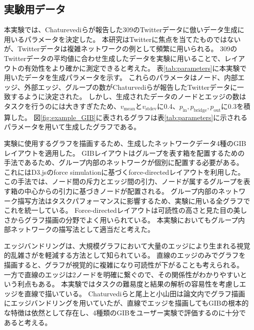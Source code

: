 \documentclass{kuee}
\begin{document}
\subsection{実験用データ}
\label{subsec:data_for_ex1}

本実験では、Chaturevediらが報告した309のTwitterデータ\cite{chaturvedi2014group}に倣いデータ生成に用いるパラメータを決定した。
本研究はTwitterに焦点を当てたものではないが、Twitterデータは複雑ネットワークの例として頻繁に用いられる。
309のTwitterデータの平均値に合わせ生成したデータを実験に用いることで、レイアウトの有効性をより確かに測定できると考えた。
表\ref{tab:parameters}に本実験で用いたデータを生成パラメータを示す。
これらのパラメータはノード、内部エッジ、外部エッジ、グループの数がChaturvediらが報告したTwitterデータに一致するように決定された。
しかし、生成されたデータのノードとエッジの数はタスクを行うのには大きすぎたため、$v_{\text{mean}}$と$v_{\text{stdev}}$に0.4、$p_{\text{in}}, p_{\text{bridge}}, p_{\text{out}}$に0.3を積算した。
図\ref{fig:example_GIB}に表されるグラフは表\ref{tab:parameters}に示されるパラメータを用いて生成したグラフである。

実験に使用するグラフを描画するため、生成したネットワークデータ4種のGIBレイアウトを適用した。
GIBレイアウトはグループを表す箱を配置するための手法であるため、グループ内部のネットワークが個別に配置する必要がある。
これにはD3.jsのforce simulation\cite{Bostock:2011:DDD:2068462.2068631}に基づくforce-directedレイアウトを利用した。
この手法では、ノード間の斥力とエッジ間の引力、ノードが属するグループを表す箱の中心からの引力に基づきノードが配置される。
グループ内部のネットワーク描写方法はタスクパフォーマンスに影響するため、実験に用いる全グラフでこれを統一している。
Force-directedレイアウトは可読性の高さと見た目の美しさからグラフ描画の分野でよく用いられている\cite{Kobourov2013ForceDirectedDA}。
本実験においてもグループ内部ネットワークの描写法として適当だと考えた。

エッジバンドリングは、大規模グラフにおいて大量のエッジにより生まれる視覚的乱雑さがを軽減する方法として知られている\cite{lhuillier2017state}。
直線のエッジのみでグラフを描画すると、グラフが視覚的に複雑になり可読性が下がることも考えられる。
一方で直線のエッジは2ノードを明確に繋ぐので、その関係性がわかりやすいという利点もある。
本実験ではタスクの難易度と結果の解析の容易性を考慮しエッジを直線で描いている。
Chaturvediら\cite{chaturvedi2014group}と尾上と小山田\cite{onoue2017optimal}は論文内でグラフ描画にエッジバンドリングを用いていたが、直線でエッジを描画してもGIBの根本的な特徴は依然として存在し、4種類のGIBをユーザー実験で評価するのに十分であると考える。
\end{document}

